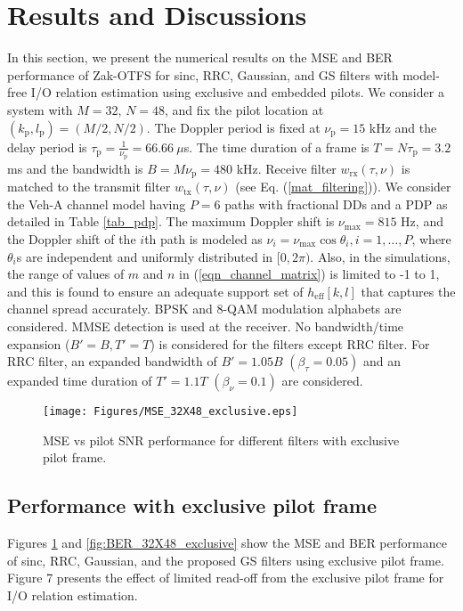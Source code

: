 \section{Results and Discussions}
\label{sec5}
In this section, we present the numerical results on the MSE and BER performance of Zak-OTFS for sinc, RRC, Gaussian, and GS filters with model-free I/O relation estimation using exclusive and embedded pilots. We consider a system with $M=32$, $N=48$, and fix the pilot location at $(k_{\mathrm{p}},l_{\mathrm{p}})=(M/2,N/2)$. The Doppler period is fixed at $\nu_{\mathrm p}=15$ kHz and the delay period is $\tau_{\mathrm p}=\frac{1}{\nu_{\mathrm p}}=66.66\ \mu$s. The time duration of a frame is $T=N\tau_{\mathrm p}=3.2$ ms and the bandwidth is $B=M\nu_{\mathrm p}=480$ kHz. 
Receive filter $w_\text{rx}(\tau,\nu)$ is matched to the transmit filter $w_\text{tx}(\tau,\nu)$ (see Eq. (\ref{mat_filtering})).
We consider the Veh-A channel model \cite{ITU_VehA} having $P=6$ paths with fractional DDs and a PDP as detailed in Table \ref{tab_pdp}. The maximum Doppler shift is $\nu_{\mathrm{max}}=815$ Hz, and the Doppler shift of the $i$th path is modeled as $\nu_{i}=\nu_{\mathrm{max}}\cos\theta_{i},i=1,\ldots,P$, where $\theta_{i}$s are independent and uniformly distributed in $[0,2\pi)$. Also, in the simulations, the range of values of $m$ and $n$ in (\ref{eqn_channel_matrix}) is limited to -1 to 1, and this is found to ensure an adequate support set of $h_{\mathrm{eff}}[k,l]$ that captures the channel spread accurately. BPSK and 8-QAM modulation alphabets are considered.
MMSE detection is used at the receiver. No bandwidth/time expansion ($B'=B, T'=T$) is considered for the filters except RRC filter. For RRC filter, an expanded bandwidth of $B'=1.05B$ $(\beta_{\tau}=0.05)$ and an expanded time duration of $T'=1.1T$ $(\beta_{\nu}=0.1)$ are considered. 


\begin{figure}[!t]
\centering
\texttt{[image: Figures/MSE\_32X48\_exclusive.eps]}
\caption{MSE vs pilot SNR performance for different filters with exclusive pilot frame.}
\label{fig:mse_32X48_exclusive}
\vspace{-4mm}
\end{figure}

\vspace{-2mm}
\subsection{Performance with exclusive pilot frame}
Figures \ref{fig:mse_32X48_exclusive} 
and \ref{fig:BER_32X48_exclusive} show the MSE and BER performance of sinc, RRC, Gaussian, and the proposed GS filters using exclusive pilot frame. Figure 7 presents the effect of limited read-off from the exclusive pilot frame for I/O relation estimation.

